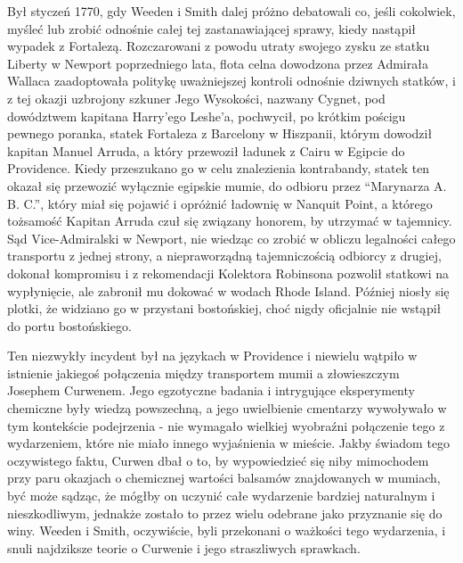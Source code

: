 Był styczeń 1770, gdy Weeden i Smith dalej próżno debatowali co, jeśli cokolwiek, myśleć lub zrobić odnośnie całej tej zastanawiającej sprawy, kiedy nastąpił wypadek z Fortalezą. Rozczarowani z powodu utraty swojego zysku ze statku Liberty w Newport poprzedniego lata, flota celna dowodzona przez Admirała Wallaca zaadoptowała politykę uważniejszej kontroli odnośnie dziwnych statków, i z tej okazji uzbrojony szkuner Jego Wysokości, nazwany Cygnet, pod dowództwem kapitana Harry'ego Leshe'a, pochwycił, po krótkim pościgu pewnego poranka, statek Fortaleza z Barcelony w Hiszpanii, którym dowodził kapitan Manuel Arruda, a który przewoził ładunek z Cairu w Egipcie do Providence. Kiedy przeszukano go w celu znalezienia kontrabandy, statek ten okazał się przewozić wyłącznie egipskie mumie, do odbioru przez ``Marynarza A. B. C.'', który miał się pojawić i opróżnić ładownię w Nanquit Point, a którego tożsamość Kapitan Arruda czuł się związany honorem, by utrzymać w tajemnicy. Sąd Vice-Admiralski w Newport, nie wiedząc co zrobić w obliczu legalności całego transportu z jednej strony, a niepraworządną tajemniczością odbiorcy z drugiej, dokonał kompromisu i z rekomendacji Kolektora Robinsona pozwolił statkowi na wypłynięcie, ale zabronił mu dokować w wodach Rhode Island. Później niosły się plotki, że widziano go w przystani bostońskiej, choć nigdy oficjalnie nie wstąpił do portu bostońskiego.  

Ten niezwykły incydent był na językach w Providence i niewielu wątpiło w istnienie jakiegoś połączenia między transportem mumii a złowieszczym Josephem Curwenem. Jego egzotyczne badania i intrygujące eksperymenty chemiczne były wiedzą powszechną, a jego uwielbienie cmentarzy wywoływało w tym kontekście podejrzenia - nie wymagało wielkiej wyobraźni połączenie tego z wydarzeniem, które nie miało innego wyjaśnienia w mieście. Jakby świadom tego oczywistego faktu, Curwen dbał o to, by wypowiedzieć się niby mimochodem przy paru okazjach o chemicznej wartości balsamów znajdowanych w mumiach, być może sądząc, że mógłby on uczynić całe wydarzenie bardziej naturalnym i nieszkodliwym, jednakże zostało to przez wielu odebrane jako przyznanie się do winy. Weeden i Smith, oczywiście, byli przekonani o ważkości tego wydarzenia, i snuli najdziksze teorie o Curwenie i jego straszliwych sprawkach.

